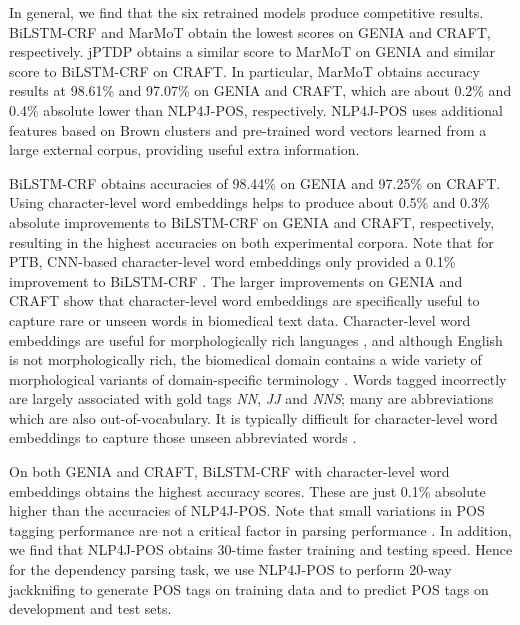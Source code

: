 \documentclass[twocolumn,hyperref]{bmcart}\pdfoutput=1
\newcommand{\CHANGEA}[1]{#1}
\begin{document}
 In general, we find that the six retrained  models produce competitive results. 
 BiLSTM-CRF and MarMoT  obtain  the lowest scores on GENIA and CRAFT, respectively. jPTDP obtains a similar score to MarMoT on GENIA and similar score to BiLSTM-CRF on CRAFT.   
In particular, MarMoT obtains accuracy results at 98.61\% and 97.07\% on GENIA and CRAFT, which are  about 0.2\% and 0.4\% absolute lower than   NLP4J-POS, respectively.  
NLP4J-POS uses additional features based on Brown clusters \cite{Brown:1992} and pre-trained word vectors learned from a large external corpus, providing useful extra information. 
 
 BiLSTM-CRF  obtains accuracies of 98.44\% on GENIA and 97.25\% on CRAFT. Using character-level word embeddings helps to produce about 0.5\% and 0.3\% absolute improvements to  BiLSTM-CRF on GENIA and CRAFT, respectively, resulting in the highest accuracies on both experimental corpora. Note that for PTB, CNN-based character-level word embeddings \cite{ma-hovy:2016:P16-1} only provided a 0.1\% improvement to  BiLSTM-CRF \cite{HuangXY15}.  
 The larger improvements on GENIA and CRAFT show that character-level word embeddings are specifically   useful to capture rare or unseen words in biomedical text data. 
 Character-level word embeddings  are useful for  morphologically rich languages \cite{plank-sogaard-goldberg:2016:P16-2,nguyen-dras-johnson-2017}, and although English is not morphologically rich, the biomedical domain contains a wide variety of morphological variants of domain-specific terminology \cite{Liu2012}. Words  tagged  incorrectly are largely associated with gold tags \textit{NN}, \textit{JJ} and \textit{NNS}; many are abbreviations which are also out-of-vocabulary. \CHANGEA{It is typically difficult  for   character-level  word embeddings to capture those unseen abbreviated words \cite{Maryam:2017}.}

On both GENIA and CRAFT, BiLSTM-CRF with character-level word embeddings obtains the highest accuracy scores. These are just  0.1\% absolute higher than the accuracies of NLP4J-POS.  
Note that small variations in POS tagging performance are not a critical factor in parsing performance \cite{seddah-EtAl:2010:SPMRL}. 
In addition, we find that NLP4J-POS obtains 30-time  faster training and testing speed. Hence for the dependency parsing task, we use NLP4J-POS to  perform 20-way jackknifing \cite{koo-carreras-collins:2008:ACLMain}  to generate POS tags on training data and to predict POS tags on development and test sets.
\end{document}
